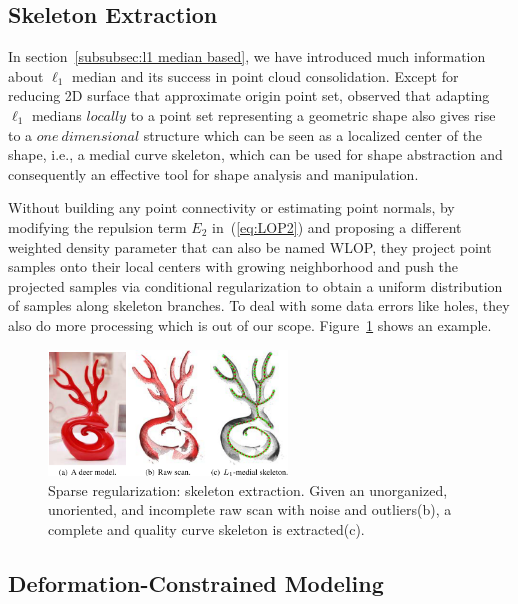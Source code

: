 


\subsection{Skeleton Extraction}
In section~\ref{subsubsec:l1 median based}, we have introduced much information about $\ell_1$ median and its success in point cloud consolidation.
Except for reducing 2D surface that approximate origin point set,
\cite{huang2013l1} observed that adapting $\ell_1$ medians $locally$ to a point set representing a geometric shape also gives rise to a $one~dimensional$ structure which can be seen as a localized center of the shape, i.e., a medial curve skeleton, which can be used for shape abstraction and consequently an effective tool for shape analysis and manipulation\cite{cornea2007curve}.

Without building any point connectivity or estimating point normals,
by modifying the repulsion term $E_2$ in~(\ref{eq:LOP2}) and proposing a different weighted density parameter that can also be named WLOP\cite{huang2009consolidation},
they project point samples onto their local centers with growing neighborhood and push the projected samples via conditional regularization to obtain a uniform distribution of samples along skeleton branches. To deal with some data errors like holes, they also do more processing which is out of our scope.
Figure~\ref{fig:skeleton extraction} shows an example.

\begin{figure}[ht]
  \centering
  \includegraphics[width=2.5in]{images/skeleton_L1}
  \caption{Sparse regularization: skeleton extraction\cite{huang2013l1}. Given an unorganized, unoriented, and incomplete raw scan with noise and outliers(b), a complete and quality curve skeleton is extracted(c).}
  \label{fig:skeleton extraction}
\end{figure}


\subsection{Deformation-Constrained Modeling}

